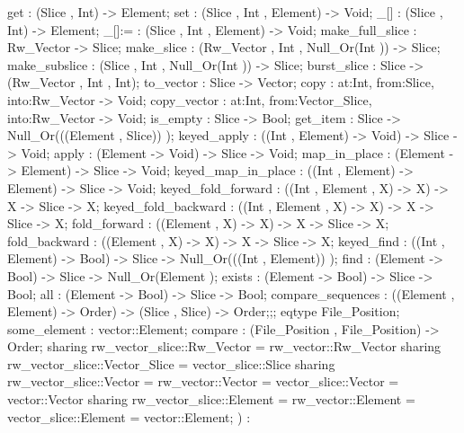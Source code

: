 {{                get : (Slice , Int) -> Element;
                set : (Slice , Int , Element) -> Void;
                _[] : (Slice , Int) -> Element;
                _[]:= : (Slice , Int , Element) -> Void;
                make_full_slice : Rw_Vector -> Slice;
                make_slice : (Rw_Vector , Int , Null_Or(Int )) -> Slice;
                make_subslice : (Slice , Int , Null_Or(Int )) -> Slice;
                burst_slice : Slice -> (Rw_Vector , Int , Int);
                to_vector : Slice -> Vector;
                copy : {at:Int, from:Slice, into:Rw_Vector} -> Void;
                copy_vector : {at:Int, from:Vector_Slice, into:Rw_Vector} -> Void;
                is_empty : Slice -> Bool;
                get_item : Slice -> Null_Or(((Element , Slice)) );
                keyed_apply : ((Int , Element) -> Void) -> Slice -> Void;
                apply : (Element -> Void) -> Slice -> Void;
                map_in_place : (Element -> Element) -> Slice -> Void;
                keyed_map_in_place : ((Int , Element) -> Element) -> Slice -> Void;
                keyed_fold_forward : ((Int , Element , X) -> X) -> X -> Slice -> X;
                keyed_fold_backward : ((Int , Element , X) -> X) -> X -> Slice -> X;
                fold_forward : ((Element , X) -> X) -> X -> Slice -> X;
                fold_backward : ((Element , X) -> X) -> X -> Slice -> X;
                keyed_find : ((Int , Element) -> Bool) -> Slice -> Null_Or(((Int , Element)) );
                find : (Element -> Bool) -> Slice -> Null_Or(Element );
                exists : (Element -> Bool) -> Slice -> Bool;
                all : (Element -> Bool) -> Slice -> Bool;
                compare_sequences : ((Element , Element) -> Order) -> (Slice , Slice) -> Order;};;
    eqtype File_Position;
    some_element : vector::Element;
    compare : (File_Position , File_Position) -> Order;
    sharing rw_vector_slice::Rw_Vector = rw_vector::Rw_Vector
    sharing rw_vector_slice::Vector_Slice = vector_slice::Slice
    sharing rw_vector_slice::Vector = rw_vector::Vector = vector_slice::Vector = vector::Vector
    sharing rw_vector_slice::Element = rw_vector::Element = vector_slice::Element = vector::Element};
)
:
